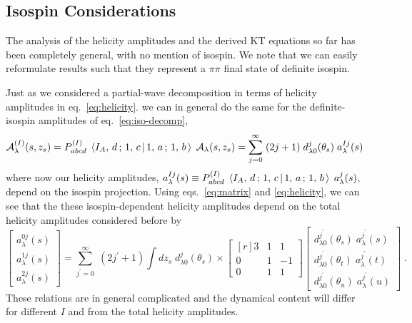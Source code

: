 \documentclass[10pt, aps,prd,amsmath,amssymb,superscriptaddress,onecolumn,
nofootinbib,showpacs,preprintnumbers]{revtex4-1}
\begin{document}
\subsection{Isospin Considerations}
\label{sec:isospin}
The analysis of the helicity amplitudes and the derived KT equations so far has been completely general, with no mention of isospin. We note that we can easily reformulate results such that they represent a \(\pi\pi\) final state of definite isospin.

Just as we considered a partial-wave decomposition in terms of helicity amplitudes in eq.~\ref{eq:helicity}. we can in general do the same for the definite-isospin amplitudes of eq.~\ref{eq:iso-decomp},
  \begin{equation}
    \mathcal{A}^{(I)}_\lambda(s,z_s) = P^{(I)}_{abcd} \; \braket{I_A, \,d \,;\,1 ,\, c \,}{\, 1, \,a \,;\, 1,\, b \,} \; \mathcal{A}_\lambda(s,z_s) = \sum_{j=0}^\infty \; (2j+1) \;
     d^j_{\lambda0}(\theta_s) \; a^{Ij}_{\lambda}(s) \,
  \end{equation}
where now our helicity amplitudes, \(a^{Ij}_{\lambda}(s) \equiv P^{(I)}_{abcd} \; \braket{I_A, \,d \,;\,1 ,\, c \,}{\, 1, \,a \,;\, 1,\, b \,} \; a^j_{\lambda}(s) \), depend on the isospin projection. Using eqs.~\ref{eq:matrix} and
\ref{eq:helicity}, we can see that the these isospin-dependent helicity amplitudes depend on the total helicity amplitudes considered before by
  \begin{equation}
    \begin{bmatrix}
      a^{0j}_{\lambda}(s) \\
      a^{1j}_{\lambda}(s) \\
      a^{2j}_{\lambda}(s)
  \end{bmatrix}
     = \sum_{j^\prime =0}^\infty \; (2j^\prime+1) \int dz_s \; d^j_{\lambda0}(\theta_s) \times
    \begin{bmatrix*}[r]
      3 & 1 & 1 \\ 	0 & 1 & -1 \\ 0 & 1 & 1
    \end{bmatrix*}
    \begin{bmatrix}
      d^{j^\prime}_{\lambda0}(\theta_s) \; a^{j^\prime}_{\lambda}(s) \\
      d^{j^\prime}_{\lambda0}(\theta_t) \; a^{j^\prime}_{\lambda}(t) \\
      d^{j^\prime}_{\lambda0}(\theta_u) \; a^{j^\prime}_{\lambda}(u)
  \end{bmatrix} \; .
  \end{equation}
 These relations are in general complicated and the dynamical content will differ for different \(I\) and from the total helicity amplitudes.
\end{document}
